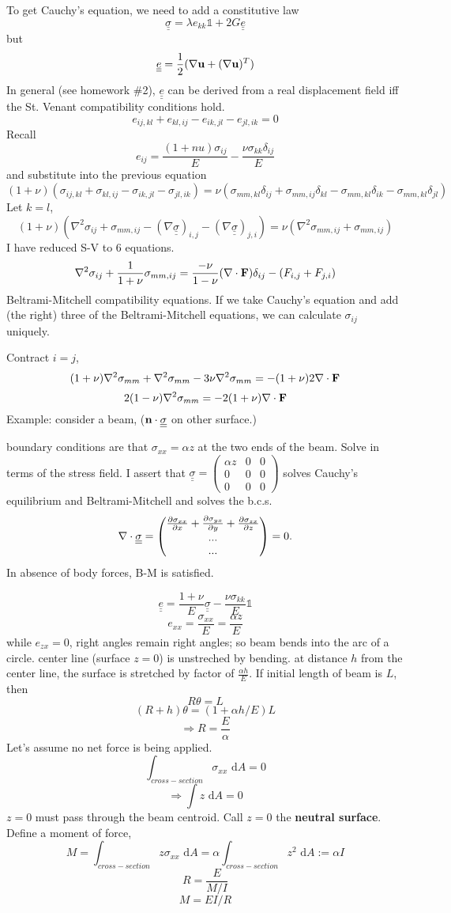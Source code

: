 \documentclass[12pt]{article}
\newcommand{\nn}{{\bf n}}
\newcommand{\uu}{{\bf u}}
\newcommand{\FF}{{\bf F}}
\newcommand{\bnabla}{{\bf \nabla}}
\newcommand{\ssigma}{{\underline{\underline \sigma}}}
\newcommand{\te}{{\underline{\underline e}}}
\newcommand{\mx}[1]{\begin{pmatrix}#1\end{pmatrix}}
\newcommand{\dx}[1]{\text{ d}#1}
\begin{document}
To get Cauchy's equation, we need to add a constitutive law
\[
\ssigma = \lambda e_{kk} \mathds 1 + 2G\te
\]
but
\[
\te = \frac 1 2 (\bnabla\uu + (\bnabla\uu)^T)
\]
In general (see homework \#2), $\te$ can be derived from a real displacement field iff the St. Venant compatibility conditions hold.
\[
e_{ij,kl} + e_{kl,ij} - e_{ik,jl} - e_{jl,ik}=0
\]
Recall
\[
e_{ij} = \frac{(1+nu)\sigma_{ij}}{E} - \frac{\nu\sigma_{kk}\delta_{ij}}{E}
\]
and substitute into the previous equation
\[
(1+\nu)(\sigma_{ij,kl} + \sigma_{kl,ij} - \sigma_{ik,jl} - \sigma_{jl,ik}) = \nu(\sigma_{mm,kl}\delta_{ij} + \sigma_{mm,ij}\delta_{kl} - \sigma_{mm,kl}\delta_{ik} - \sigma_{mm,kl}\delta_{jl} )
\]
Let $k=l$,
\[
(1+\nu)(\nabla^2\sigma_{ij} + \sigma_{mm,ij} - (\nabla\ssigma)_{i,j}  - (\nabla\ssigma)_{j,i} ) = \nu (\nabla^2\sigma_{mm,ij} + \sigma_{mm,ij})
\]
I have reduced S-V to 6 equations.
\[
\nabla^2\sigma_{ij} + \frac{1}{1+\nu}\sigma_{mm,ij} = \frac{-\nu}{1-\nu}(\bnabla\cdot\FF)\delta_{ij} - (F_{i,j}+ F_{j,i})
\]
Beltrami-Mitchell compatibility equations.
If we take Cauchy's equation and add (the right) three of the Beltrami-Mitchell equations, we can calculate $\sigma_{ij}$ uniquely.


Contract  $i=j$,
\[
(1+\nu)\nabla^2\sigma_{mm} + \nabla^2\sigma_{mm} - 3\nu\nabla^2\sigma_{mm} = -(1+\nu)2\bnabla\cdot\FF
\]
\[
2(1-\nu)\nabla^2\sigma_{mm} = -2(1+\nu)\nabla\cdot\FF
\]
Example: consider a beam, ($\nn\cdot\ssigma$ on other surface.)

boundary conditions are that $\sigma_{xx}   = \alpha z $ at the two ends of the beam.
Solve in terms of the stress field.
I assert that $\ssigma = \mx{\alpha z & 0 & 0\\ 0&0&0\\0&0&0}$ solves Cauchy's equilibrium and Beltrami-Mitchell and solves the b.c.s. 
\[
\bnabla\cdot \ssigma = \mx{\frac{\partial \sigma_{xx}}{\partial x}+ \frac{\partial \sigma_{yx}}{\partial y} + \frac{\partial \sigma_{zx}}{\partial z} \\...\\...} = 0.
\]
In absence of body forces, B-M is satisfied.

\[
\te = \frac{1+\nu}{E}\ssigma - \frac{\nu\sigma_{kk}}{E}\mathds 1 
\]
\[
e_{xx} = \frac{\sigma_{xx}}{E} = \frac{\alpha z}{E}
\]
while $e_{zx}=0$, right angles remain right angles; so beam bends into the arc of a circle. center line (surface $z=0$) is unstreched by bending. at distance $h$ from the center line, the surface is stretched by factor of $\frac{\alpha h}{E}$. If initial length of beam is $L$, then
\[
R\theta = L
\]
\[
(R+h)\theta = (1+\alpha h/E)L
\]
\[
\Rightarrow R = \frac E \alpha
\]
Let's assume no net force is being applied.
\[
\int_{cross-section} \sigma_{xx}\dx{A}=0
\]
\[
\Rightarrow \int z \dx{A} = 0
\]
$z=0$ must pass through the beam centroid. Call $z=0$ the {\bf neutral surface}.
Define a moment of force,
\[
M = \int_{cross-section} z\sigma_{xx}\dx{A} = \alpha \int_{cross-section}z^2\dx{A}:= \alpha I
\]
\[
R = \frac{E}{M/I}
\]
\[
M = EI/R
\]
\end{document}
